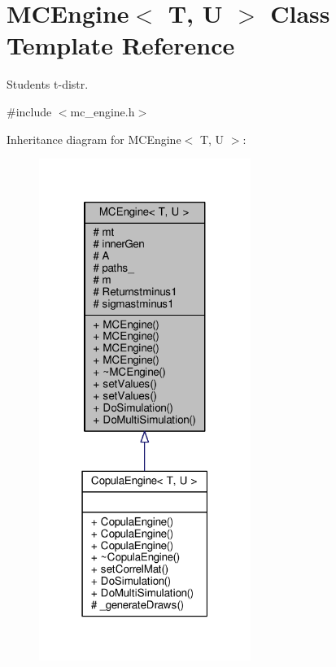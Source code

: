\hypertarget{classMCEngine}{}\section{M\+C\+Engine$<$ T, U $>$ Class Template Reference}
\label{classMCEngine}


Student\textquotesingle{}s t-\/distr.  




{\ttfamily \#include $<$mc\+\_\+engine.\+h$>$}



Inheritance diagram for M\+C\+Engine$<$ T, U $>$\+:
\nopagebreak
\begin{figure}[H]
\begin{center}
\leavevmode
\includegraphics[width=195pt]{classMCEngine__inherit__graph}
\end{center}
\end{figure}


